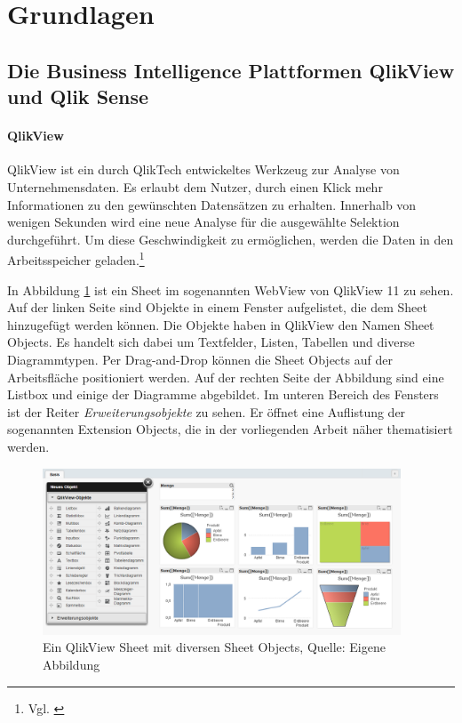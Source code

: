 \section{Grundlagen}
\label{lab:Grundlagen} 

\subsection{Die Business Intelligence Plattformen QlikView und Qlik Sense}

\paragraph{QlikView}
QlikView ist ein durch QlikTech entwickeltes Werkzeug zur Analyse von Unternehmensdaten. Es erlaubt dem Nutzer, durch einen Klick mehr Informationen zu den gewünschten Datensätzen zu erhalten. Innerhalb von wenigen Sekunden wird eine neue Analyse für die ausgewählte Selektion durchgeführt. Um diese Geschwindigkeit zu ermöglichen, werden die Daten in den Arbeitsspeicher geladen.\footnote{Vgl. \cite[S. 90]{stasienkobi}}


In Abbildung \ref{fig:Sheet} ist ein Sheet im sogenannten WebView von QlikView 11 zu sehen. Auf der linken Seite sind Objekte in einem Fenster aufgelistet, die dem Sheet hinzugefügt werden können. Die Objekte haben in QlikView den Namen Sheet Objects. Es handelt sich dabei um Textfelder, Listen, Tabellen und diverse Diagrammtypen. Per Drag-and-Drop können die Sheet Objects auf der Arbeitsfläche positioniert werden. Auf der rechten Seite der Abbildung sind eine Listbox und einige der Diagramme abgebildet. Im unteren Bereich des Fensters ist der Reiter \textit{Erweiterungsobjekte} zu sehen. Er öffnet eine Auflistung der sogenannten Extension Objects, die in der vorliegenden Arbeit näher thematisiert werden.

\begin{figure}[htbp]
	\centering
		\includegraphics[width=0.95\textwidth]{img/QlikView/Sheet.png}
	\caption[Ein QlikView Sheet mit diversen Sheet Objects]{Ein QlikView Sheet mit diversen Sheet Objects, Quelle: Eigene Abbildung}
	\label{fig:Sheet}
\end{figure}


